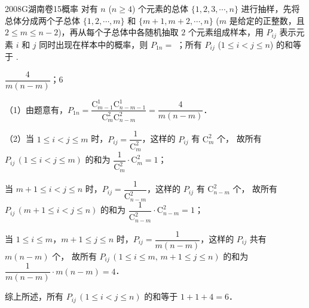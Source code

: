 
\begin{problem}{2008}{G}{湖南卷}{15}{概率}
对有 $n$ ($n\geqslant 4$) 个元素的总体 $\{1,2,3,\cdots,n\}$ 进行抽样，先将总体分成两个子总体 $\{1,2,\cdots,m\}$ 和 $\{m+1,m+2,\cdots,n\}$ ($m$ 是给定的正整数，且 $2\leqslant m\leqslant n-2$)，再从每个子总体中各随机抽取 $2$ 个元素组成样本，用 $P_{ij}$ 表示元素 $i$ 和 $j$ 同时出现在样本中的概率，则 $P_{1n}=$ \underline{\hspace{4em}}；所有 $P_{ij}$ ($1\leqslant i<j\leqslant n$) 的和等于 \underline{\hspace{4em}}.
\end{problem}

\begin{answer}
$ \dfrac{4}{m(n-m)} $；$ 6 $
\end{answer}

\begin{solutions}
（1）由题意有，$ P_{1n}=\dfrac{\mathrm{C}_{m-1}^{1}\mathrm{C}_{n-m-1}^{1}}{\mathrm{C}_{m}^{2}\mathrm{C}_{n-m}^{2}}=\dfrac{4}{m(n-m)} $．

（2）当 $ 1\leqslant i<j\leqslant m $ 时，$ P_{ij}=\dfrac{1}{\mathrm{C}_{m}^{2}} $，这样的 $ P_{ij} $ 有 $ \mathrm{C}_{m}^{2} $ 个，  
故所有 $ P_{ij}\,(1\leqslant i<j\leqslant m) $ 的和为 $ \dfrac{1}{\mathrm{C}_{m}^{2}}\cdot\mathrm{C}_{m}^{2}=1 $；  

当 $ m+1\leqslant i<j\leqslant n $ 时，$ P_{ij}=\dfrac{1}{\mathrm{C}_{n-m}^{2}} $，这样的 $ P_{ij} $ 有 $ \mathrm{C}_{n-m}^{2} $ 个，  
故所有 $ P_{ij}\,(m+1\leqslant i<j\leqslant n) $ 的和为 $ \dfrac{1}{\mathrm{C}_{n-m}^{2}}\cdot\mathrm{C}_{n-m}^{2}=1 $；  

当 $ 1\leqslant i\leqslant m $，$ m+1\leqslant j\leqslant n $ 时，$ P_{ij}=\dfrac{1}{m(n-m)} $，这样的 $ P_{ij} $ 共有 $ m(n-m) $ 个，  
故所有 $ P_{ij}\,(1\leqslant i\leqslant m,\,m+1\leqslant j\leqslant n) $ 的和为 $ \dfrac{1}{m(n-m)}\cdot m(n-m)=4 $．  

综上所述，所有 $ P_{ij}\,(1\leqslant i<j\leqslant n) $ 的和等于 $ 1+1+4=6 $．
\end{solutions}